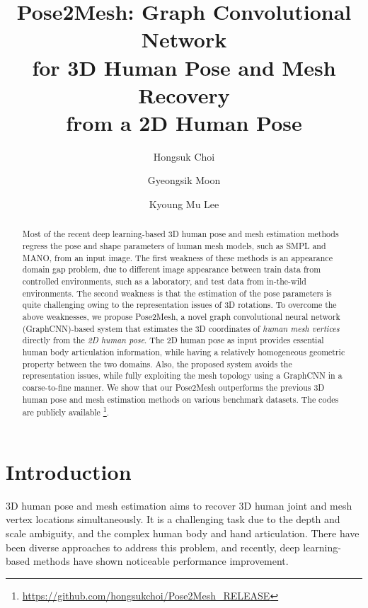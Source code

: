\documentclass[runningheads]{llncs}
\makeatletter
\def\blfootnote{\xdef\@thefnmark{}\@footnotetext}
\makeatother
\begin{document}
\pagestyle{headings}
\mainmatter

\title{Pose2Mesh: Graph Convolutional Network \\ for 3D Human Pose and Mesh Recovery \\ from a 2D Human Pose} 


\author{Hongsuk Choi\and
Gyeongsik Moon\and
Kyoung Mu Lee}

\maketitle

\begin{abstract}
Most of the recent deep learning-based 3D human pose and mesh estimation methods regress the pose and shape parameters of human mesh models, such as SMPL and MANO, from an input image.
The first weakness of these methods is an appearance domain gap problem, due to different image appearance between train data from controlled environments, such as a laboratory, and test data from in-the-wild environments.
The second weakness is that the estimation of the pose parameters is quite challenging owing to the representation issues of 3D rotations.
To overcome the above weaknesses, we propose Pose2Mesh, a novel graph convolutional neural network (GraphCNN)-based system that estimates the 3D coordinates of {\em human mesh vertices} directly from the {\em 2D human pose}.
The 2D human pose as input provides essential human body articulation information, while having a relatively homogeneous geometric property between the two domains. 
Also, the proposed system avoids the representation issues, while fully exploiting the mesh topology using a GraphCNN in a coarse-to-fine manner.
We show that our Pose2Mesh outperforms the previous 3D human pose and mesh estimation methods on various benchmark datasets.\blfootnote{* equal contribution}
The codes are publicly available \footnote{\url{https://github.com/hongsukchoi/Pose2Mesh_RELEASE}}.


\end{abstract}

\section{Introduction}
3D human pose and mesh estimation aims to recover 3D human joint and mesh vertex locations simultaneously.
It is a challenging task due to the depth and scale ambiguity, and the complex human body and hand articulation. 
There have been diverse approaches to address this problem, and recently, deep learning-based methods have shown noticeable performance improvement.
\end{document}
